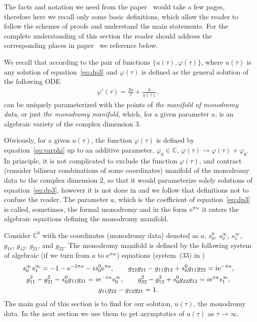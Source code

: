 \documentclass[pdftex]{sigma}
\numberwithin{equation}{section}
\begin{document}
The facts and notation we need from the paper~\cite{KV2004} would take a few pages, therefore
here we recall only some basic definitions, which allow the reader to follow the schemes of proofs and
understand the main statements. For the complete understanding of this section the reader should address
the corresponding places in paper~\cite{KV2004} we reference below.

We recall that according to \cite{KV2004} the pair of functions $\{u(\tau),\varphi(\tau)\}$, where $u(\tau)$ is
any solution of equation~\eqref{eq:dp3} and $\varphi(\tau)$ is defined as the general solution of the following ODE
\begin{gather}\label{eq:varphi}
\varphi'(\tau)=\frac{2a}{\tau}+\frac{b}{u(\tau)},
\end{gather}
can be uniquely parameterized with the points of {\it the manifold of monodromy data}, or just
{\it the monodromy manifold}, which, for a given parameter $a$, is an algebraic
variety of the complex dimension $3$.

Obviously, for a given $u(\tau)$, the function $\varphi(\tau)$ is defined
by equation~\eqref{eq:varphi} up to an additive parameter, $\varphi_0\in\mathbb C$,
$\varphi(\tau)\to\varphi(\tau)+\varphi_0$. In principle, it is not complicated to exclude the function $\varphi(\tau)$,
and contract (consider bilinear combinations of some coordinates) manifold of the monodromy data to the complex
dimension $2$, so that it would parameterize solely solutions of equation~\eqref{eq:dp3}, however it is not done in
\cite{KV2004} and we follow that definitions not to confuse the reader.
The parameter $a$, which is the coefficient of equation~\eqref{eq:dp3} is called, sometimes, the formal monodromy
and in the form ${\rm e}^{\pi a}$ it enters the algebraic equations defining the monodromy manifold.

Consider ${\mathbb C}^8$ with the coordinates (monodromy data) denoted as $a$, $s_0^0$, $s_0^\infty$, $s_1^\infty$,
$g_{11}$, $g_{12}$, $g_{21}$, and $g_{22}$. The monodromy manifold is defined by the following system of algebraic
(if we turn from $a$ to ${\rm e}^{\pi a}$) equations (system~(33) in \cite{KV2004})
\begin{gather}
 s_0^{\infty}s_1^{\infty}=-1-{\rm e}^{-2\pi a}-is_0^0{\rm e}^{\pi a}, \qquad
 g_{22}g_{21}-g_{11}g_{12}+s_0^0g_{11}g_{22}=i{\rm e}^{-\pi a},\nonumber\\
 g_{11}^2-g_{21}^2-s_0^0g_{11}g_{21}=i{\rm e}^{-\pi a}s_0^\infty,\qquad
 g_{22}^2-g_{12}^2+s_0^0g_{22}g_{12}=i{\rm e}^{\pi a}s_1^\infty,\nonumber\\
 g_{11}g_{22}-g_{12}g_{21}=1.\label{monodromy-manifold}
\end{gather}
The main goal of this section is to find for our solution, $u(\tau)$, the monodromy data. In the next section we
use them to get asymptotics of $u(\tau)$ as $\tau\to\infty$.
\end{document}
